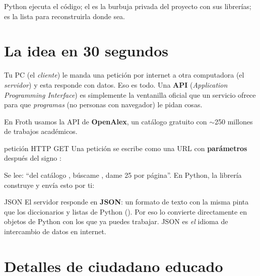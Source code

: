 \documentclass[11pt,a4paper]{article}
\begin{document}
\begin{resumen}
Python ejecuta el código; el  es la burbuja privada del proyecto con sus
librerías;  es la lista para reconstruirla donde sea.
\end{resumen}
\clearpage
{}
{}

\section{La idea en 30 segundos}

Tu PC (el \emph{cliente}) le manda una petición por internet a otra computadora
(el \emph{servidor}) y esta responde con datos. Eso es todo. Una \textbf{API}
(\emph{Application Programming Interface}) es simplemente la ventanilla oficial que un
servicio ofrece para que \emph{programas} (no personas con navegador) le pidan cosas.

En Froth usamos la API de \textbf{OpenAlex}, un catálogo gratuito con $\sim$250 millones
de trabajos académicos.

\begin{concepto}{petición HTTP GET}
Una petición se escribe como una URL con \textbf{parámetros} después del signo :
\begin{center}
\small{}
\end{center}
Se lee: ``del catálogo , búscame , dame 25 por
página''. En Python, la librería  construye y envía esto por ti:
\begin{center}
\end{center}
\end{concepto}

\begin{concepto}{JSON}
El servidor responde en \textbf{JSON}: un formato de texto con la misma pinta que los
diccionarios y listas de Python ().
Por eso  lo convierte directamente en objetos de Python con los que ya
puedes trabajar. JSON es \emph{el} idioma de intercambio de datos en internet.
\end{concepto}

\section{Detalles de ciudadano educado}
\end{document}
